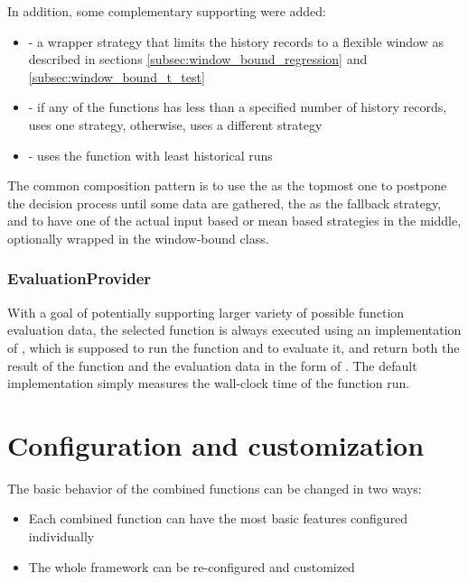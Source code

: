 In addition, some complementary supporting were added:
\begin{itemize}
	\item {} - a wrapper strategy that limits the history records to a flexible window as described in sections \ref{subsec:window_bound_regression} and \ref{subsec:window_bound_t_test}
\item {} - if any of the functions has less than a specified number of history records, uses one strategy, otherwise, uses a different strategy
\item {} - uses the function with least historical runs
\end{itemize}

The common composition pattern is to use the  as the topmost one to postpone the decision process until some data are gathered, the  as the fallback strategy, and to have one of the actual input based or mean based strategies in the middle, optionally wrapped in the window-bound class.

\subsubsection{EvaluationProvider}

With a goal of potentially supporting larger variety of possible function evaluation data, the selected function is always executed using an implementation of , which is supposed to run the function and to evaluate it, and return both the result of the function and the evaluation data in the form of . The default implementation simply measures the wall-clock time of the function run.

\section{Configuration and customization}

The basic behavior of the combined functions can be changed in two ways:
\begin{itemize}
	\item Each combined function can have the most basic features configured individually
	\item The whole framework can be re-configured and customized
\end{itemize}


